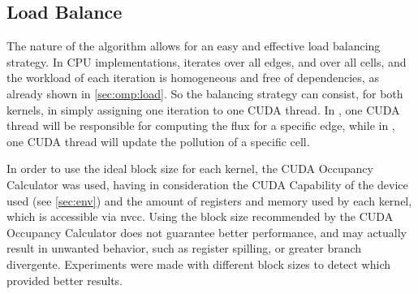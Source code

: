 \subsection{Load Balance}
\label{subsec:cuda:load}


The nature of the algorithm allows for an easy and effective load balancing strategy.
In CPU implementations, \computeflux iterates over all edges, and \update over all cells, and the workload of each iteration is homogeneous and free of dependencies, as already shown in \cref{sec:omp:load}.
So the balancing strategy can consist, for both kernels, in simply assigning one iteration to one CUDA thread.
In \computeflux, one CUDA thread will be responsible for computing the flux for a specific edge, while in \update, one CUDA thread will update the pollution of a specific cell.

In order to use the ideal block size for each kernel, the CUDA Occupancy Calculator \cite{cuda_documentation} was used, having in consideration the CUDA Capability of the device used (see \cref{sec:env}) and the amount of registers and memory used by each kernel, which is accessible via nvcc.
Using the block size recommended by the CUDA Occupancy Calculator does not guarantee better performance, and may actually result in unwanted behavior, such as register spilling, or greater branch divergente. Experiments were made with different block sizes to detect which provided better results.
